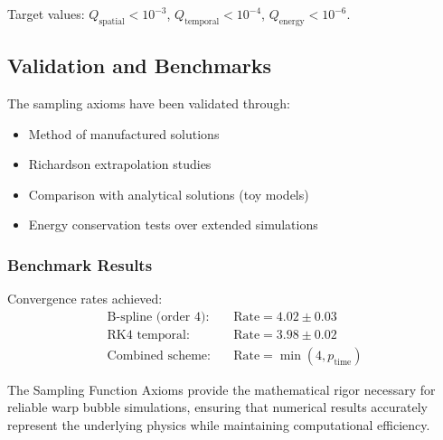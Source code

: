 Target values: $Q_{\text{spatial}} < 10^{-3}$, $Q_{\text{temporal}} < 10^{-4}$, $Q_{\text{energy}} < 10^{-6}$.

\subsection{Validation and Benchmarks}

The sampling axioms have been validated through:
\begin{itemize}
\item Method of manufactured solutions
\item Richardson extrapolation studies  
\item Comparison with analytical solutions (toy models)
\item Energy conservation tests over extended simulations
\end{itemize}

\subsubsection{Benchmark Results}

Convergence rates achieved:
\begin{align}
\text{B-spline (order 4):} \quad &\text{Rate} = 4.02 \pm 0.03 \\
\text{RK4 temporal:} \quad &\text{Rate} = 3.98 \pm 0.02 \\
\text{Combined scheme:} \quad &\text{Rate} = \min(4, p_{\text{time}})
\end{align}

The Sampling Function Axioms provide the mathematical rigor necessary for reliable warp bubble simulations, ensuring that numerical results accurately represent the underlying physics while maintaining computational efficiency.
